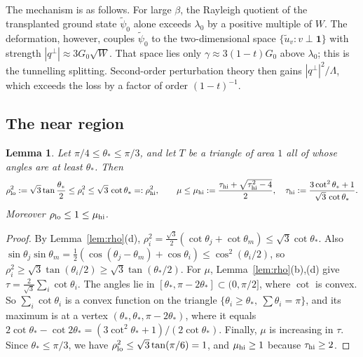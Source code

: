\documentclass[11pt]{article}
\newtheorem{lemma}[theorem]{Lemma}
\theoremstyle{remark}
\newcommand{\one}{\mathbf 1}
\begin{document}
The mechanism is as follows. For large $\beta$, the Rayleigh quotient of the transplanted ground state
$\tilde\psi_0$ alone exceeds $\lambda_0$ by a positive multiple of $W$. The deformation, however, couples
$\tilde\psi_0$ to the two-dimensional space $\{\tilde u_v:v\perp\one\}$ with strength
$|q^\perp|\approx3G_0\sqrt W$. That space lies only $\gamma\approx3(1-t)G_0$ above $\lambda_0$; this is the
tunnelling splitting. Second-order perturbation theory then gains $|q^\perp|^2/\Lambda$, which exceeds the
loss by a factor of order $(1-t)^{-1}$.

\subsection{The near region}

\begin{lemma}\label{lem:geomC}
Let $\pi/4\le\theta_*\le\pi/3$, and let $T$ be a triangle of area $1$ all of whose angles are at least
$\theta_*$. Then
\[
  \rho_{\rm lo}^2:=\sqrt3\tan\frac{\theta_*}2\le\rho_i^2\le\sqrt3\,\cot\theta_*=:\rho_{\rm hi}^2,
  \qquad
  \mu\le\mu_{\rm hi}:=\frac{\tau_{\rm hi}+\sqrt{\tau_{\rm hi}^2-4}}2,\quad
  \tau_{\rm hi}:=\frac{3\cot^2\theta_*+1}{\sqrt3\,\cot\theta_*}.
\]
Moreover $\rho_{\rm lo}\le1\le\mu_{\rm hi}$.
\end{lemma}

\begin{proof}
By Lemma~\ref{lem:rho}(d), $\rho_i^2=\frac{\sqrt3}2(\cot\theta_j+\cot\theta_m)\le\sqrt3\cot\theta_*$.
Also $\sin\theta_j\sin\theta_m=\frac12(\cos(\theta_j-\theta_m)+\cos\theta_i)\le\cos^2(\theta_i/2)$, so
$\rho_i^2\ge\sqrt3\tan(\theta_i/2)\ge\sqrt3\tan(\theta_*/2)$. For $\mu$, Lemma~\ref{lem:rho}(b),(d) give
$\tau=\frac2{\sqrt3}\sum_i\cot\theta_i$. The angles lie in $[\theta_*,\pi-2\theta_*]\subset(0,\pi/2]$, where
$\cot$ is convex. So $\sum_i\cot\theta_i$ is a convex function on the triangle
$\{\theta_i\ge\theta_*,\ \sum\theta_i=\pi\}$, and its maximum is at a vertex
$(\theta_*,\theta_*,\pi-2\theta_*)$, where it equals $2\cot\theta_*-\cot2\theta_*=(3\cot^2\theta_*+1)/(2\cot\theta_*)$.
Finally, $\mu$ is increasing in $\tau$. Since $\theta_*\le\pi/3$, we have
$\rho_{\rm lo}^2\le\sqrt3\tan(\pi/6)=1$, and $\mu_{\rm hi}\ge1$ because $\tau_{\rm hi}\ge2$.
\end{proof}
\end{document}
